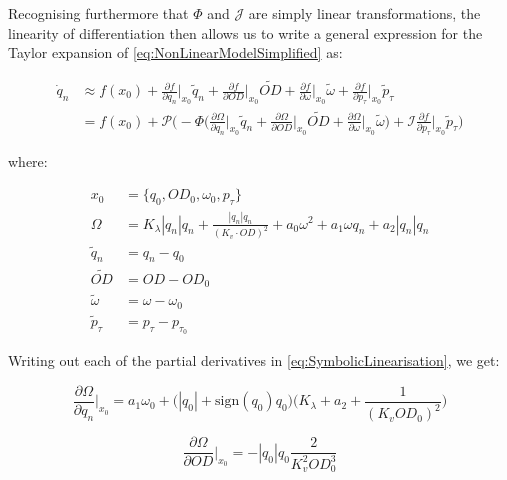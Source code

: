Recognising furthermore that $\Phi$ and $\mathcal{J}$ are simply linear transformations, the linearity of differentiation then allows us to write a general expression for the Taylor expansion of \cref{eq:NonLinearModelSimplified} as:

\begin{equation}\label{eq:SymbolicLinearisation}
	\begin{split}
		\dot{q}_n &\approx f(x_0) + \frac{\partial f}{\partial q_n}\bigg\rvert_{x_0} \tilde{q}_n + \frac{\partial f}{\partial OD}\bigg\rvert_{x_0} \tilde{OD} + \frac{\partial f}{\partial \omega}\bigg\rvert_{x_0} \tilde{\omega} +  \frac{\partial f}{\partial p_\tau}\bigg\rvert_{x_0} \tilde{p}_\tau
		\\
		&= f(x_0) + \mathcal{P}\Big(-\Phi\Big( \frac{\partial \Omega}{\partial q_n}\bigg\rvert_{x_0} \tilde{q}_n + \frac{\partial \Omega}{\partial OD}\bigg\rvert_{x_0} \tilde{OD} + \frac{\partial \Omega}{\partial \omega}\bigg\rvert_{x_0} \tilde{\omega} \Big) + \mathcal{I} \frac{\partial f}{\partial p_\tau}\bigg\rvert_{x_0} \tilde{p}_\tau \Big)
	\end{split}
\end{equation}

where: 

\begin{align}
	x_0 &= \{q_0,OD_0,\omega_0, p_\tau \} \label{eq:EquilibriumPoint} \\
	\Omega &= K_\lambda|q_n|q_n+\frac{|q_n|q_n}{(K_v\cdot OD)^2}+a_0\omega^2+a_1\omega q_n+a_2|q_n|q_n \label{eq:OmegaFun} \\
	\tilde{q}_n &= q_n - q_0 \label{eq:QTilde} \\
	\tilde{OD} &= OD - OD_0 \label{eq:ODTilde} \\ 
	\tilde{\omega} &= \omega - \omega_0 \label{eq:OmegaTilde} \\
	\tilde{p}_\tau &= p_\tau - p_{\tau_0}
\end{align}

Writing out each of the partial derivatives in \cref{eq:SymbolicLinearisation}, we get:

\begin{equation}\label{eq:PartialTaylorQ}
	\frac{\partial \Omega}{\partial q_n}\bigg\rvert_{x_0} 
	=
	a_1\omega_0 + \Big(|q_0|+ \text{sign}(q_0)q_0\Big)\Bigg(K_\lambda + a_2 + \frac{1}{(K_v OD_0)^2}\Bigg) 
\end{equation}

\begin{equation}\label{eq:PartialTaylorOD}
	\frac{\partial \Omega}{\partial OD}\bigg\rvert_{x_0} 
	=
	-|q_0|q_0 \frac{2}{K_v^2 OD_0^3}
\end{equation}

